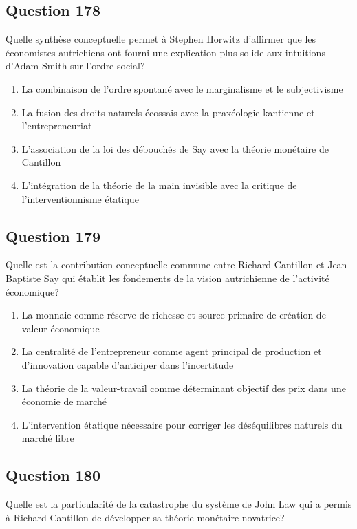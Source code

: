 \documentclass[12pt,a4paper]{article}
\begin{document}
\bigskip


\subsection*{Question 178}
Quelle synthèse conceptuelle permet à Stephen Horwitz d'affirmer que les économistes autrichiens ont fourni une explication plus solide aux intuitions d'Adam Smith sur l'ordre social?

\begin{enumerate}[label=\Alph*., leftmargin=*]
\item La combinaison de l'ordre spontané avec le marginalisme et le subjectivisme
\item La fusion des droits naturels écossais avec la praxéologie kantienne et l'entrepreneuriat
\item L'association de la loi des débouchés de Say avec la théorie monétaire de Cantillon
\item L'intégration de la théorie de la main invisible avec la critique de l'interventionnisme étatique
\end{enumerate}

\bigskip


\subsection*{Question 179}
Quelle est la contribution conceptuelle commune entre Richard Cantillon et Jean-Baptiste Say qui établit les fondements de la vision autrichienne de l'activité économique?

\begin{enumerate}[label=\Alph*., leftmargin=*]
\item La monnaie comme réserve de richesse et source primaire de création de valeur économique
\item La centralité de l'entrepreneur comme agent principal de production et d'innovation capable d'anticiper dans l'incertitude
\item La théorie de la valeur-travail comme déterminant objectif des prix dans une économie de marché
\item L'intervention étatique nécessaire pour corriger les déséquilibres naturels du marché libre
\end{enumerate}

\bigskip


\subsection*{Question 180}
Quelle est la particularité de la catastrophe du système de John Law qui a permis à Richard Cantillon de développer sa théorie monétaire novatrice?
\end{document}
